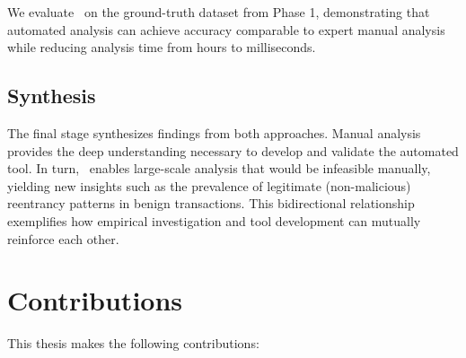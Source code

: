 We evaluate \ToolName\ on the ground-truth dataset from Phase 1, demonstrating that automated analysis can achieve accuracy comparable to expert manual analysis while reducing analysis time from hours to milliseconds.

\subsection{Synthesis}

The final stage synthesizes findings from both approaches. Manual analysis provides the deep understanding necessary to develop and validate the automated tool. In turn, \ToolName\ enables large-scale analysis that would be infeasible manually, yielding new insights such as the prevalence of legitimate (non-malicious) reentrancy patterns in benign transactions. This bidirectional relationship exemplifies how empirical investigation and tool development can mutually reinforce each other.

\section{Contributions}
\label{sec:intro-contributions}

This thesis makes the following contributions:

